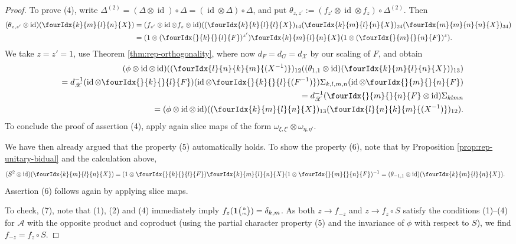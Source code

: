 \documentclass[10pt]{article}
\DeclareMathOperator{\id}{id}
\newcommand{\Grt}[3]{#1{\tiny {\begin{pmatrix} #2\\#3\end{pmatrix}}}}
\newcommand{\UnitC}[2]{\Grt{\mathbf{1}}{#1}{#2}}
\newcommand{\Gr}[5]{\fourIdx{#2}{#4}{#3}{#5}{#1}}%
\newcommand{\Gru}[3]{\Gr{#1}{}{}{#2}{#3}}
\theoremstyle{definition}
\numberwithin{equation}{section}
\begin{document}
\begin{proof}
To prove (4), write $ \Delta^{(2)} = (
    \Delta \otimes \id)\circ  \Delta = (\id \otimes 
    \Delta) \circ \Delta$, and put $\theta_{z,z'}:=(f_{z'} \otimes \id
    \otimes f_{z})\circ  \Delta^{(2)}.$ Then
    \begin{align*}
      (\theta_{z,z'} \otimes \id)(\Gr{X}{k}{l}{m}{n}) &= (f_{z'} \otimes
      \id \otimes f_{z} \otimes
      \id)((\Gr{X}{k}{l}{k}{l})_{14}(\Gr{X}{k}{l}{m}{n})_{24}(\Gr{X}{m}{n}{m}{n})_{34})
      \\
      &= (1 \otimes (\Gru{F}{k}{l})^{z'}) \Gr{X}{k}{l}{m}{n} (1
      \otimes (\Gru{F}{m}{n})^{z}).
    \end{align*}
    We take $z=z'=1$, use Theorem \ref{thm:rep-orthogonality}, where
    now $d_F= d_G=d_{\mathscr{X}}$ by our scaling of $F$, and obtain
    \begin{eqnarray*}
     && \hspace{-2cm} (\phi \otimes \id \otimes
      \id)((\Gr{(X^{-1})}{l}{k}{n}{m})_{12}((\theta_{1,1} \otimes
      \id)(\Gr{X}{k}{l}{m}{n}))_{13})\\ && =d_{\mathscr{X}}^{-1}(\id \otimes
      \Gru{F}{k}{l}) (\id \otimes \Gru{(F^{-1})}{k}{l})
      \Sigma_{k,l,m,n} (\id \otimes
      \Gru{F}{m}{n}) \\
      &&=d_{\mathscr{X}}^{-1}(\Gru{F}{m}{n} \otimes \id) \Sigma_{klmn} \\
      &&= (\phi \otimes \id \otimes
      \id)((\Gr{X}{k}{l}{m}{n})_{13}(\Gr{(X^{-1})}{l}{k}{n}{m})_{12}).
    \end{eqnarray*}
    To conclude the proof of assertion (4), apply again slice maps of the form
    $\omega_{\xi,\xi'} \otimes \omega_{\eta,\eta'}$.

We have then already argued that the property (5) automatically holds. To show the property (6), note that by Proposition \ref{prop:rep-unitary-bidual} and the calculation above,
    \begin{align*}
      (S^{2} \otimes \id)(\Gr{X}{k}{l}{m}{n}) &= (1
      \otimes\Gru{F}{k}{l})
      \Gr{X}{k}{l}{m}{n}(1 \otimes \Gru{F}{m}{n})^{-1} 
      =(\theta_{-1,1}  \otimes \id)(\Gr{X}{k}{l}{m}{n}).
    \end{align*}
     Assertion (6) follows again by applying slice maps.
    
     To check, (7), note that (1), (2) and (4) immediately imply
     $f_{z}(\UnitC{k}{m})=\delta_{k,m}$. As both $z \rightarrow
     f_{-z}$ and $z\rightarrow f_z\circ S$ satisfy the conditions
     (1)--(4) for $\mathscr{A}$ with the opposite product and
     coproduct (using the partial character property (5) and the
     invariance of $\phi$ with respect to $S$), we find $f_{-z} =
     f_{z} \circ S$.


\end{proof}
\end{document}
